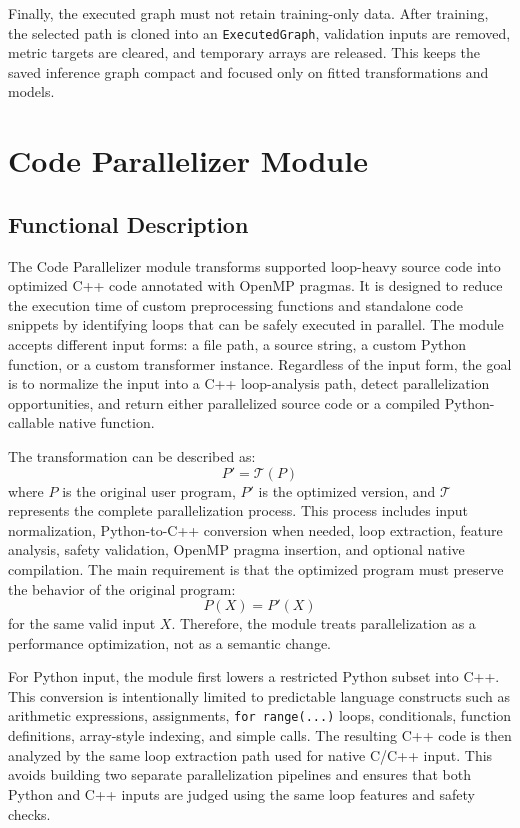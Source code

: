 \documentclass[12pt,a4paper,oneside]{report}
\begin{document}
Finally, the executed graph must not retain training-only data. After training,
the selected path is cloned into an \texttt{ExecutedGraph}, validation inputs are
removed, metric targets are cleared, and temporary arrays are released. This
keeps the saved inference graph compact and focused only on fitted
transformations and models.


\section{Code Parallelizer Module}
\label{sec:methodology-code-parallelizer}

\subsection{Functional Description}
The Code Parallelizer module transforms supported loop-heavy source code into
optimized C++ code annotated with OpenMP pragmas. It is designed to reduce the
execution time of custom preprocessing functions and standalone code snippets by
identifying loops that can be safely executed in parallel. The module accepts
different input forms: a file path, a source string, a custom Python function,
or a custom transformer instance. Regardless of the input form, the goal is to
normalize the input into a C++ loop-analysis path, detect parallelization
opportunities, and return either parallelized source code or a compiled
Python-callable native function.

The transformation can be described as:
\[
P' = \mathcal{T}(P)
\]
where \(P\) is the original user program, \(P'\) is the optimized version, and
\(\mathcal{T}\) represents the complete parallelization process. This process
includes input normalization, Python-to-C++ conversion when needed, loop
extraction, feature analysis, safety validation, OpenMP pragma insertion, and
optional native compilation. The main requirement is that the optimized program
must preserve the behavior of the original program:
\[
P(X) = P'(X)
\]
for the same valid input \(X\). Therefore, the module treats parallelization as
a performance optimization, not as a semantic change.

For Python input, the module first lowers a restricted Python subset into C++.
This conversion is intentionally limited to predictable language constructs such
as arithmetic expressions, assignments, \texttt{for range(...)} loops,
conditionals, function definitions, array-style indexing, and simple calls. The
resulting C++ code is then analyzed by the same loop extraction path used for
native C/C++ input. This avoids building two separate parallelization pipelines
and ensures that both Python and C++ inputs are judged using the same loop
features and safety checks.
\end{document}
